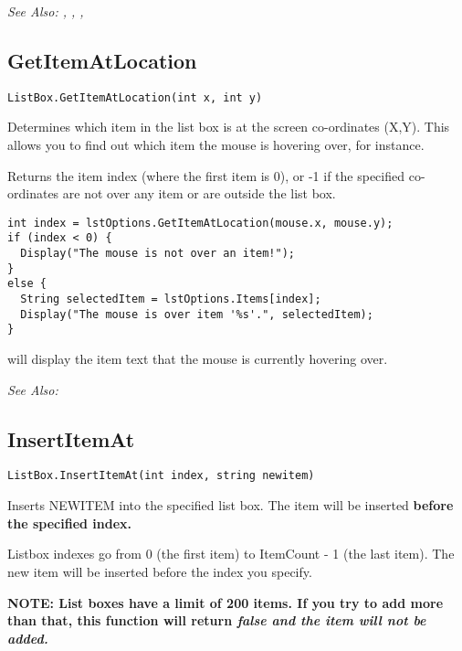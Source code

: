 \it{See Also:} ,
,
,


\subsection{GetItemAtLocation}\label{ListBox.GetItemAtLocation}%

\begin{verbatim}
ListBox.GetItemAtLocation(int x, int y)
\end{verbatim}
Determines which item in the list box is at the screen co-ordinates (X,Y).
This allows you to find out which item the mouse is hovering over, for instance.

Returns the item index (where the first item is 0), or -1 if the specified co-ordinates
are not over any item or are outside the list box.

\begin{verbatim}
int index = lstOptions.GetItemAtLocation(mouse.x, mouse.y);
if (index < 0) {
  Display("The mouse is not over an item!");
}
else {
  String selectedItem = lstOptions.Items[index];
  Display("The mouse is over item '%s'.", selectedItem);
}
\end{verbatim}
will display the item text that the mouse is currently hovering over.

\it{See Also:} 


\subsection{InsertItemAt}\label{ListBox.InsertItemAt}%

\begin{verbatim}
ListBox.InsertItemAt(int index, string newitem)
\end{verbatim}
Inserts NEWITEM into the specified list box. The item will be inserted \bf{before}
the specified index.

Listbox indexes go from 0 (the first item) to ItemCount - 1 (the last item). The new
item will be inserted before the index you specify.

\bf{NOTE:} List boxes have a limit of 200 items. If you try to add more than that,
this function will return \it{false} and the item will not be added.

